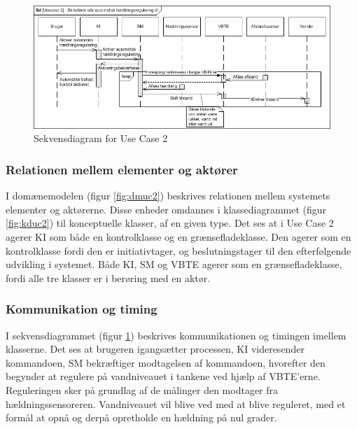 \begin{figure}[H]
\centering
\includegraphics[scale=0.8]{billeder/Systemarkitektur/SD_UC2}
\caption{Sekvensdiagram for Use Case 2}
\label{fig:sduc2}
\end{figure}
\subsubsection{Relationen mellem elementer og aktører}
I domænemodelen (figur \ref{fig:dmuc2}) beskrives relationen mellem systemets elementer og aktørerne. Disse enheder omdannes i klassediagrammet (figur \ref{fig:kduc2}) til konceptuelle klasser, af en given type. Det ses at i Use Case 2 agerer KI som både en kontrolklasse og en grænsefladeklasse. Den agerer som en kontrolklasse fordi den er initiativtager, og beslutningstager til den efterfølgende udvikling i systemet. Både KI, SM og VBTE agerer som en grænsefladeklasse, fordi alle tre klasser er i berøring med en aktør.\\

\subsubsection{Kommunikation og timing}
I sekvensdiagrammet (figur \ref{fig:sduc2}) beskrives kommunikationen og timingen imellem klasserne. Det ses at brugeren igangsætter processen, KI videresender kommandoen, SM bekræftiger modtagelsen af kommandoen, hvorefter den begynder at regulere på vandniveauet i tankene ved hjælp af VBTE'erne. Reguleringen sker på grundlag af de målinger den modtager fra hældningssensoreren. Vandniveauet vil blive ved med at blive reguleret, med et formål at opnå og derpå opretholde en hældning på nul grader.

